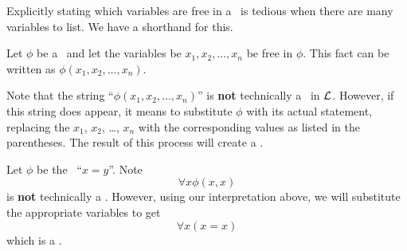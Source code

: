 Explicitly stating which variables are free in a \wff~is tedious when there are many variables to list. We have a shorthand for this.

\begin{definition}
    Let $\phi$ be a \wff~and let the variables be $x_1, x_2, \dots, x_n$ be free in $\phi$. This fact can be written as $\phi(x_1, x_2, \dots, x_n)$.
\end{definition}

Note that the string ``$\phi(x_1, x_2, \dots, x_n)$'' is \textbf{not} technically a \wff~in $\mathcal{L}$. However, if this string does appear, it means to substitute $\phi$ with its actual statement, replacing the $x_1$, $x_2$, \dots, $x_n$ with the corresponding values as listed in the parentheses. The result of this process will create a \wff.

\begin{example}
    Let $\phi$ be the \wff~``$x=y$''. Note
    \[
        \forall x \phi(x, x)
    \]
    is \textbf{not} technically a \wff. However, using our interpretation above, we will substitute the appropriate variables to get
    \[
        \forall x (x=x)
    \]
    which is a \wff.
\end{example}
